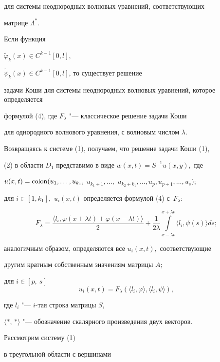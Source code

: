 для системы неоднородных волновых уравнений, соответствующих

матрице $\Lambda^{*}$.

\begin{theorem} 

Если функция 

$\widetilde{\varphi}_{k}(x)\in C^{k-1}[0, l],$ 

$\widetilde{\psi}_{k}(x)\in C^{k-1}[0, l]$, то существует решение 

задачи Коши для системы неоднородных волновых уравнений, которое определяется 

формулой {\rm (4),} где $F_{\lambda}$ "--- классическое решение задачи Коши 

для однородного волнового уравнения{\rm,} с волновым числом $\lambda.$

\end{theorem}



Возвращаясь к системе (1), получаем, что решение задачи Коши (1),

(2) в области $D_{1}$ представимо в виде  $w(x, t)=S^{-1}u(x, y),$  где

$u(x, t)={\rm colon}(u_{1}, \dots, u_{k_{1}},$ $ u_{k_{1}+1}, \dots,$ $

u_{k_{2}+k_{1}}, \dots, u_{p}, u_{p+1}, \dots,u_{s})$;

для $i\in[1, k_{1}],$  $u_{i}(x, t)$ определяется формулой (4) с~$F_{\lambda}:$

$$

F_{\lambda}=\dfrac{\langle l_{i},\varphi(x+\lambda t)+\varphi(x-\lambda t)\rangle}{2}+\dfrac{1}{2\lambda}\int\limits_{x-\lambda t}^{x+\lambda t}\langle l_{i},\psi(s)\rangle ds;

$$

аналогичным образом, определяются все $u_{i}(x,t),$ соответствующие

другим кратным собственным значениям матрицы $A;$

для $i\in[p,~s]$ $$u_{i}(x, t)=F_{\lambda}(\langle l_{i}, \varphi\rangle, \langle l_{i}, \psi\rangle),$$

где  $l_{i}$ "--- $i$-тая строка матрицы $S,$ 

$\langle *,\, *\rangle$ "--- обозначение скалярного произведения двух векторов.



 Рассмотрим систему (1)

в треугольной области  с вершинами

